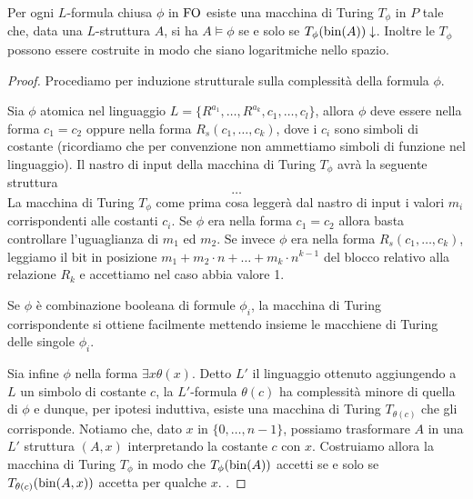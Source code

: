 \begin{lemma}
 Per ogni $L$-formula chiusa $\phi$ in $\operatorname{FO}$ esiste
 una macchina di Turing $T_\phi$ in $P$ tale che, data una $L$-struttura $A$,
 si ha $A \models \phi$ se e solo se $T_\phi(\operatorname{bin}(A))\downarrow$. Inoltre
 le $T_\phi$ possono essere costruite in modo che siano logaritmiche nello spazio.
\end{lemma}
\begin{proof}
 Procediamo per induzione strutturale sulla complessità della formula $\phi$.
 
 Sia $\phi$ atomica nel linguaggio $L=\{ R^{a_1},\ldots,R^{a_k},c_1,\ldots,c_l \}$,
 allora $\phi$ deve essere nella forma $c_1=c_2$ oppure nella forma $R_s(c_1,\ldots, c_k)$,
 dove i $c_i$ sono simboli di costante (ricordiamo che per convenzione
 non ammettiamo simboli di funzione nel linguaggio). Il nastro di input della
 macchina di Turing $T_\phi$ avrà la seguente struttura
 \[ \ldots \]
 La macchina di Turing $T_\phi$ come prima cosa leggerà dal nastro di
 input i valori $m_i$ corrispondenti alle costanti $c_i$.
 Se $\phi$ era nella forma $c_1 = c_2$ allora basta controllare l'uguaglianza
 di $m_1$ ed $m_2$. Se invece $\phi$ era nella forma $R_s(c_1,\ldots,c_k)$,
 leggiamo il bit in posizione $m_1 + m_2 \cdot n + \ldots + m_k \cdot n^{k-1}$
 del blocco relativo alla relazione $R_k$ e accettiamo nel caso abbia valore 1.
 
 Se $\phi$ è combinazione booleana di formule $\phi_i$,
 la macchina di Turing corrispondente si ottiene facilmente mettendo insieme le
 macchiene di Turing delle singole $\phi_i$.
 
 Sia infine $\phi$ nella forma $\exists x \theta(x)$. Detto $L'$ il linguaggio
 ottenuto aggiungendo a $L$ un simbolo di costante $c$,
 la $L'$-formula $\theta(c)$ ha complessità minore di quella di $\phi$
 e dunque, per ipotesi induttiva, esiste una
 macchina di Turing $T_{\theta(c)}$ che gli corrisponde.
 Notiamo che, dato $x$ in $\{0,\ldots, n-1\}$, possiamo trasformare $A$ in una $L'$
 struttura $(A,x)$ interpretando la costante $c$ con $x$.
 Costruiamo allora la macchina di Turing $T_\phi$ in modo che $T_\phi(\operatorname{bin}(A))$
 accetti se e solo se $T_{\theta(c)}(\operatorname{bin}(A,x))$ accetta per qualche $x$.
 .
\end{proof}

